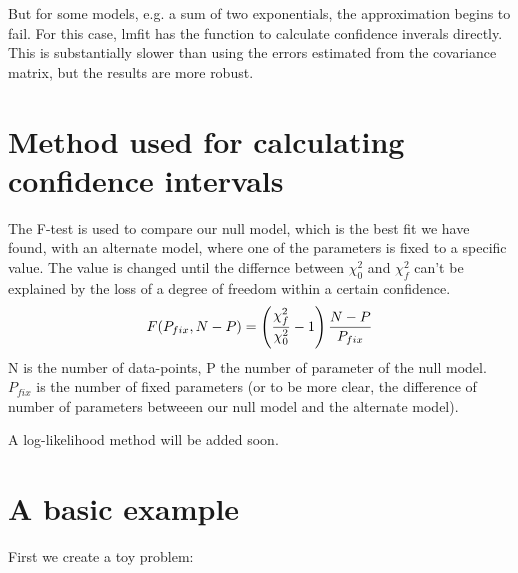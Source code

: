 \documentclass[letterpaper,10pt,english]{sphinxmanual}
\begin{document}
But for some models, e.g. a sum of two exponentials, the approximation
begins to fail. For this case, lmfit has the function {\hyperref[confidence:confidence.conf_interval]{}}
to calculate confidence inverals directly.  This is substantially slower
than using the errors estimated from the covariance matrix, but the results
are more robust.


\section{Method used for calculating confidence intervals}
\label{confidence:method-used-for-calculating-confidence-intervals}
The F-test is used to compare our null model, which is the best fit we have
found, with an alternate model, where one of the parameters is fixed to a
specific value. The value is changed until the differnce between $\chi^2_0$
and $\chi^2_{f}$ can't be explained by the loss of a degree of freedom
within a certain confidence.
\begin{gather}
\begin{split}F(P_{fix},N-P) = \left(\frac{\chi^2_f}{\chi^2_{0}}-1\right)\frac{N-P}{P_{fix}}\end{split}\notag
\end{gather}
N is the number of data-points, P the number of parameter of the null model.
$P_{fix}$ is the number of fixed parameters (or to be more clear, the
difference of number of parameters betweeen our null model and the alternate
model).

A log-likelihood method will be added soon.


\section{A basic example}
\label{confidence:a-basic-example}
First we create a toy problem:
\end{document}

